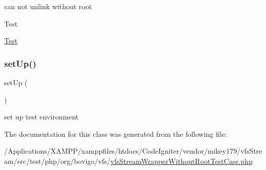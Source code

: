 can not unlink without root

\begin{DoxyRefDesc}{Test}
\item[\mbox{\hyperlink{test__test000287}{Test}}]\end{DoxyRefDesc}
\mbox{\label{classorg_1_1bovigo_1_1vfs_1_1vfs_stream_wrapper_without_root_test_case_a0bc688732d2b3b162ffebaf7812e78da}} 
\subsubsection{\texorpdfstring{set\+Up()}{setUp()}}
{\footnotesize\ttfamily set\+Up (\begin{DoxyParamCaption}{ }\end{DoxyParamCaption})}

set up test environment 

The documentation for this class was generated from the following file\+:\begin{DoxyCompactItemize}
\item 
/\+Applications/\+X\+A\+M\+P\+P/xamppfiles/htdocs/\+Code\+Igniter/vendor/mikey179/vfs\+Stream/src/test/php/org/bovigo/vfs/\mbox{\hyperlink{vfs_stream_wrapper_without_root_test_case_8php}{vfs\+Stream\+Wrapper\+Without\+Root\+Test\+Case.\+php}}\end{DoxyCompactItemize}
